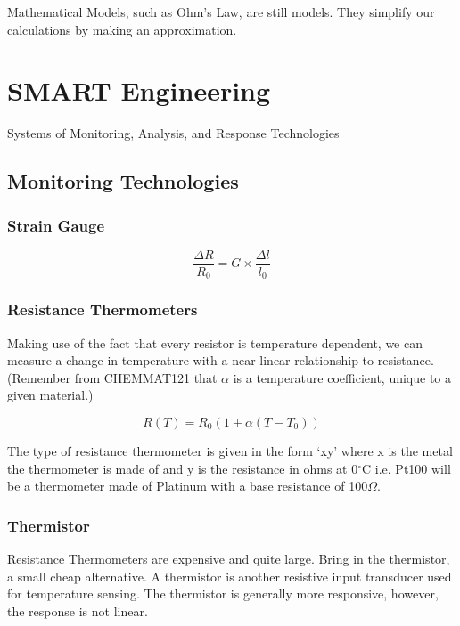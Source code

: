 \documentclass[12pt]{article}
\begin{document}
Mathematical Models, such as Ohm's Law, are still models. 
They simplify our calculations by making an approximation.

\section{SMART Engineering}
\begin{definition*}
  Systems of Monitoring, Analysis, and Response Technologies
\end{definition*}

\subsection{Monitoring Technologies}
\subsubsection{Strain Gauge}
\begin{equation*}
  \frac{\Delta R}{R_0} = G \times \frac{\Delta l}{l_0} 
\end{equation*}

\subsubsection{Resistance Thermometers}
Making use of the fact that every resistor is temperature dependent, we can measure a change in temperature with a near linear relationship to resistance.
(Remember from CHEMMAT121 that $\alpha$ is a temperature coefficient, unique to a given material.)

\begin{equation*}
  R(T) = R_0(1+\alpha(T-T_0))
\end{equation*}


The type of resistance thermometer is given in the form `xy' where x is the metal the thermometer is made of and y is the resistance in ohms at 0$^\circ$C i.e. Pt100 will be a thermometer made of Platinum with a base resistance of 100$\Omega$.

\subsubsection{Thermistor}
Resistance Thermometers are expensive and quite large.
Bring in the thermistor, a small cheap alternative.
A thermistor is another resistive input transducer used for temperature sensing.
The thermistor is generally more responsive, however, the response is not linear.
\end{document}
